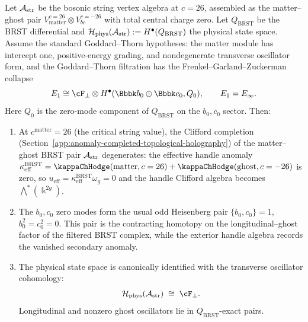\begin{theorem}[$c=26$ BRST anomaly cancellation and Clifford degeneration;
\ClaimStatusProvedHere]
\label{thm:c26-no-ghost-clifford-degeneration}
Let $\mathcal{A}_{\mathrm{str}}$ be the bosonic string vertex algebra at
$c = 26$, assembled as the matter--ghost pair
$V_{\mathrm{matter}}^{c=26} \otimes V_{bc}^{c=-26}$ with total
central charge zero. Let $Q_{\mathrm{BRST}}$ be the BRST differential
and $\mathcal{H}_{\mathrm{phys}}(\mathcal{A}_{\mathrm{str}}) :=
H^\bullet(Q_{\mathrm{BRST}})$ the physical state space. Assume the
standard Goddard--Thorn hypotheses: the matter module has intercept one,
positive-energy grading, and nondegenerate transverse oscillator form,
and the Goddard--Thorn filtration has the Frenkel--Garland--Zuckerman
collapse
\[
E_1 \cong \cF_{\perp}\otimes H^\bullet(\Bbbk b_0\oplus \Bbbk c_0,
Q_0),
\qquad
E_1 = E_\infty .
\]
Here $Q_0$ is the zero-mode component of $Q_{\mathrm{BRST}}$ on the
$b_0,c_0$ sector.
Then:
\begin{enumerate}[label=\textup{(\roman*)}]
\item At $c^{\mathrm{matter}}=26$ (the critical string value), the
Clifford completion
(Section~\ref{app:anomaly-completed-topological-holography})
of the matter--ghost BRST pair $\mathcal{A}_{\mathrm{str}}$ degenerates:
the effective handle anomaly
$\kappa_{\mathrm{eff}}^{\mathrm{BRST}} =
\kappaChHodge(\text{matter},c=26)+\kappaChHodge(\text{ghost},c=-26)$ is zero, so
$u_{\mathrm{eff}}=\kappa_{\mathrm{eff}}^{\mathrm{BRST}}\omega_g=0$ and
the handle Clifford algebra becomes
$\bigwedge^*(\Bbbk^{2g})$.
\item The $b_0,c_0$ zero modes form the usual odd Heisenberg pair
$\{b_0,c_0\}=1$, $b_0^2=c_0^2=0$. This pair is the contracting
homotopy on the longitudinal--ghost factor of the filtered BRST
complex, while the exterior handle algebra records the vanished
secondary anomaly.
\item The physical state space is canonically identified with the
transverse oscillator cohomology:
\[
\cH_{\mathrm{phys}}(\cA_{\mathrm{str}})
\;\cong\;
\cF_{\perp}.
\]
Longitudinal and nonzero ghost oscillators lie in
$Q_{\mathrm{BRST}}$-exact pairs.
\end{enumerate}
\end{theorem}

